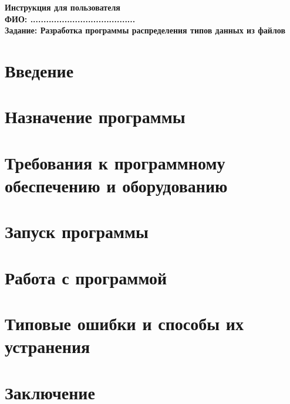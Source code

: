 \documentclass[a4paper,12pt]{article}
\begin{document}
\begin{center}
    \Large \textbf{Инструкция для пользователя} \\
    \vspace{0.5cm}
    \textbf{ФИО: ........................................} \\
    \vspace{0.5cm}
    \textbf{Задание: Разработка программы распределения типов данных из файлов}
\end{center}

\vspace{1cm}

\section*{Введение}

\section{Назначение программы}

\section{Требования к программному обеспечению и оборудованию}

\section{Запуск программы}

\section{Работа с программой}

\section{Типовые ошибки и способы их устранения}

\section{Заключение}
\end{document}
